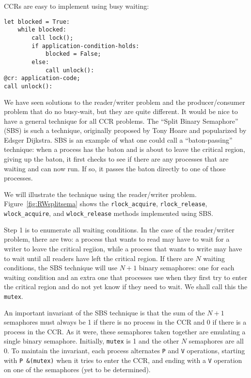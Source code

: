 \documentclass{report}
\newenvironment{code}{
\tcolorbox
}{
\endtcolorbox
}
\begin{document}
CCRs are easy to implement using busy waiting:
\begin{code}
\begin{verbatim}
let blocked = True:
    while blocked:
        call lock();
        if application-condition-holds:
            blocked = False;
        else:
            call unlock():
@cr: application-code;
call unlock():
\end{verbatim}
\end{code}

We have seen solutions to the reader/writer problem and the producer/consumer
problem that do no busy-wait, but they are quite different.  It would be nice
to have a general technique for all CCR problems.
The ``Split Binary Semaphore'' (SBS) is such a technique, originally proposed by
Tony Hoare and popularized by Edsger Dijkstra.
SBS is an example of what one could call a ``baton-passing'' technique:
when a process has the
baton and is about to leave the critical region, giving up the baton, it first
checks to see if there are any processes that are waiting and can now run.
If so, it passes the baton directly to one of those processes.

We will illustrate the technique using the reader/writer problem.
Figure~\ref{fig:RWsplitsema} shows the
\texttt{rlock\_acquire}, \texttt{rlock\_release},
\texttt{wlock\_acquire}, and \texttt{wlock\_release} methods implemented using
SBS.

Step 1 is to enumerate all waiting conditions.  In the case of the reader/writer
problem, there are two: a process that wants to read may have to wait for a
writer to leave the critical regiion, while a process that wants to write may
have to wait until all readers have left the critical region.  If there are $N$
waiting conditions, the SBS technique will use $N+1$ binary semaphores: one for
each waiting condition and an extra one that processes use when they first try
to enter the critical region and do not yet know if they need to wait.
We shall call this the \texttt{mutex}.

An important invariant of the SBS technique is that the sum of the $N+1$ semaphores
must always be 1 if there is no process in the CCR and 0 if there is
a process in the CCR.  As it were, these semaphores taken together are emulating a
single binary semaphore.
Initially, \texttt{mutex} is 1 and the other $N$ semaphores
are all 0.  To maintain the invariant, each process alternates \texttt{P} and
\texttt{V} operations, starting with \texttt{P~\&(mutex)} when it tries to
enter the CCR, and ending with a \texttt{V} operation on one of the semaphores
(yet to be determined).
\end{document}
